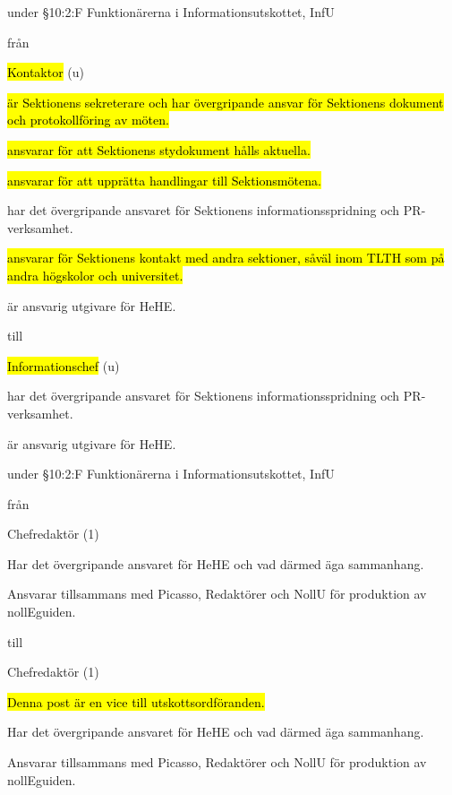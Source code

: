 \documentclass[../_main/handlingar.tex]{subfiles}
\begin{document}
\begin{attsatser}
\begin{description}[font=$\bullet$~\normalfont\scshape\color{black!50!black}]
    \newpage
    
    
    \item under §10:2:F Funktionärerna i Informationsutskottet, InfU 


    från 

    \hl{Kontaktor} (u)
        \begin{dashlist}
            \item \hl{är Sektionens sekreterare och har övergripande ansvar för Sektionens dokument och protokollföring av möten.}
            \item \hl{ansvarar för att Sektionens stydokument hålls aktuella.}
            \item \hl{ansvarar för att upprätta handlingar till Sektionsmötena.}
            \item har det övergripande ansvaret för Sektionens informationsspridning och PR-verksamhet.
            \item \hl{ansvarar för Sektionens kontakt med andra sektioner, såväl inom TLTH som på andra högskolor och universitet.}
            \item är ansvarig utgivare för HeHE.
        \end{dashlist}

    till

    \hl{Informationschef} (u)
        \begin{dashlist}
            \item har det övergripande ansvaret för Sektionens informationsspridning och PR-verksamhet.
            \item är ansvarig utgivare för HeHE.
        \end{dashlist}
    
  
    \item under §10:2:F Funktionärerna i Informationsutskottet, InfU 
 

    från

    Chefredaktör (1)
    		\begin{dashlist}
    		\item Har det övergripande ansvaret för HeHE och vad därmed äga sammanhang.
            \item Ansvarar tillsammans med Picasso, Redaktörer och NollU för produktion av nollEguiden.
    		\end{dashlist}

    till

    Chefredaktör (1)
    		\begin{dashlist}
            \item \hl{Denna post är en vice till utskottsordföranden.}
    		\item Har det övergripande ansvaret för HeHE och vad därmed äga sammanhang.
            \item Ansvarar tillsammans med Picasso, Redaktörer och NollU för produktion av nollEguiden.
    		\end{dashlist}
    

\end{description}
\end{attsatser}
\end{document}
